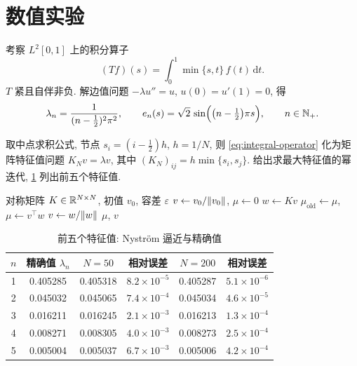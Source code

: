 \section{数值实验}\label{sec:numerics}

\begin{example}\label{ex:min-kernel}
考察 $L^2[0,1]$ 上的积分算子
\begin{equation}\label{eq:integral-operator}
  (Tf)(s)=\int_0^1\min\{s,t\}\,f(t)\,\mathrm{d}t .
\end{equation}
$T$ 紧且自伴非负. 解边值问题 $-\lambda u''=u$, $u(0)=u'(1)=0$, 得
\begin{equation}\label{eq:exact-eigen}
  \lambda_n=\frac{1}{(n-\frac12)^2\pi^2},\qquad e_n(s)=\sqrt2\,\sin\Bigl(\bigl(n-\tfrac12\bigr)\pi s\Bigr),\qquad n\in\mathbb{N}_+ .
\end{equation}
\end{example}

取中点求积公式, 节点 $s_i=(i-\frac12)h$, $h=1/N$, 则 \cref{eq:integral-operator} 化为矩阵特征值问题 $K_N v=\lambda v$, 其中 $(K_N)_{ij}=h\min\{s_i,s_j\}$.  给出求最大特征值的幂迭代, \cref{tab:eigen} 列出前五个特征值.

\begin{algorithm}[htbp]
\caption{带 Rayleigh 商的幂迭代}\label{alg:power}
\begin{algorithmic}[1]
\Require 对称矩阵 $K\in\mathbb{R}^{N\times N}$, 初值 $v_0$, 容差 $\varepsilon$
\State $v\gets v_0/\lVert v_0\rVert$, $\mu\gets0$
\Repeat
  \State $w\gets Kv$
  \State $\mu_{\mathrm{old}}\gets\mu$, $\mu\gets v^{\top}w$
  \State $v\gets w/\lVert w\rVert$
\State \Return $\mu$, $v$
\end{algorithmic}
\end{algorithm}

\begin{table}[htbp]
\centering
\caption{前五个特征值: Nyström 逼近与精确值}\label{tab:eigen}
\begin{tabular}{cccccc}
\toprule
$n$ & 精确值 $\lambda_n$ & $N=50$ & 相对误差 & $N=200$ & 相对误差 \\
\midrule
1 & 0.405285 & 0.405318 & $8.2\times10^{-5}$ & 0.405287 & $5.1\times10^{-6}$ \\
2 & 0.045032 & 0.045065 & $7.4\times10^{-4}$ & 0.045034 & $4.6\times10^{-5}$ \\
3 & 0.016211 & 0.016245 & $2.1\times10^{-3}$ & 0.016213 & $1.3\times10^{-4}$ \\
4 & 0.008271 & 0.008305 & $4.0\times10^{-3}$ & 0.008273 & $2.5\times10^{-4}$ \\
5 & 0.005004 & 0.005037 & $6.7\times10^{-3}$ & 0.005006 & $4.2\times10^{-4}$ \\
\bottomrule
\end{tabular}
\end{table}

